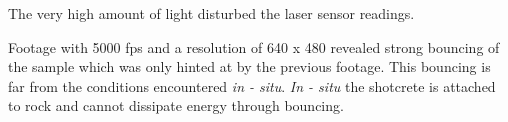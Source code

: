 The very high amount of light disturbed the laser sensor readings.

Footage with 5000 fps and a resolution of 640 x 480 revealed strong bouncing of the sample which was only hinted at by the previous footage. This bouncing is far from the conditions encountered \textit{in - situ}. \textit{In - situ} the shotcrete is attached to rock and cannot dissipate energy through bouncing.   

 


